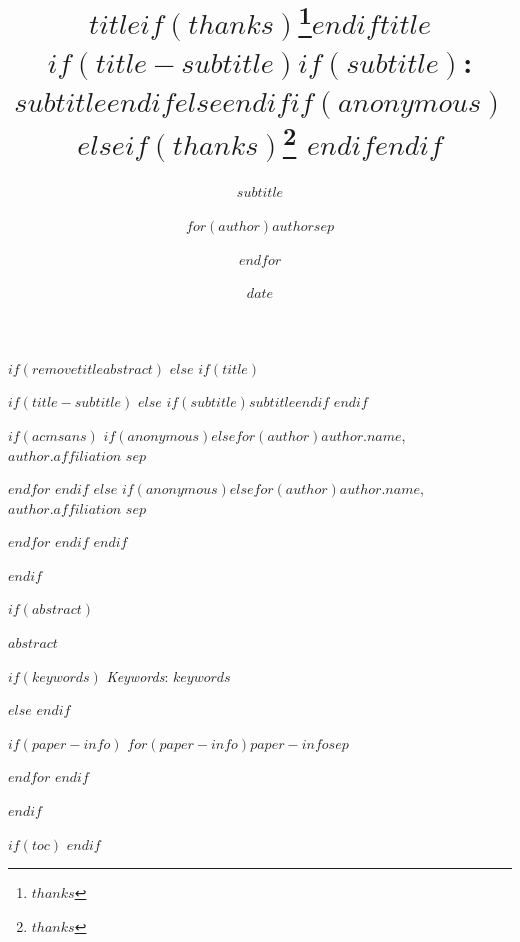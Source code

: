 \documentclass[
$if(fontsize)$
  $fontsize$,
$endif$
$if(lang)$
  $babel-lang$,
$endif$
$if(papersize)$
  $papersize$paper,
$endif$
$if(beamer)$
  ignorenonframetext,
$if(handout)$
  handout,
$endif$
$if(aspectratio)$
  aspectratio=$aspectratio$,
$endif$
$endif$
$for(classoption)$
  $classoption$$sep$,
$endfor$
]{$documentclass$}
\title{$title$$if(thanks)$\thanks{$thanks$}$endif$}
\subtitle{$subtitle$}
\author{$for(author)$$author$$sep$ \and $endfor$}
\date{$date$}
\institute{$for(institute)$$institute$$sep$ \and $endfor$}
\title{$title$$if(title-subtitle)$$if(subtitle)$: $subtitle$$endif$$else$$endif$$if(anonymous)$$else$$if(thanks)$\thanks{$thanks$} $endif$$endif$ }
\date{}
\renewenvironment{abstract}
 {{%
    \setlength{\leftmargin}{0mm}
    \setlength{\rightmargin}{\leftmargin}%
  }%
  \relax}
 {\endlist}
\begin{document}


$if(removetitleabstract)$
$else$
$if(title)$

{%
\setlength{\parindent}{0pt}
\thispagestyle{plain}
{%
\maketitle  %
}

$if(title-subtitle)$
$else$
$if(subtitle)$\emph{$subtitle$}$endif$
$endif$

{
   \vskip 13.5pt\relax \normalsize\fontsize{11}{12}
   $if(acmsans)$
$if(anonymous)$\hfill $else$$for(author)$\MakeUppercase{\textsf{\large $author.name$}}, \small{$author.affiliation$}  $sep$ \par $endfor$ $endif$
$else$
$if(anonymous)$\hfill $else$$for(author)$\MakeUppercase{$author.name$}, \small{$author.affiliation$}  $sep$ \par \vskip -3.5pt $endfor$ $endif$
$endif$

}

}


$endif$



$if(abstract)$



\begin{abstract}


    \vskip 8.5pt %

\noindent \small{$abstract$}

$if(keywords)$
\vskip 8.5pt \noindent \emph{Keywords}: $keywords$ \par
$else$
$endif$

$if(paper-info)$
$for(paper-info)$$paper-info$$sep$\vspace{1pt}\par
$endfor$
$endif$

\end{abstract}

$endif$

\vskip 8.5pt

$if(toc)$
{
\hypersetup{linkcolor=black}
\setcounter{tocdepth}{$toc-depth$}
\tableofcontents
}
$endif$
\end{document}

